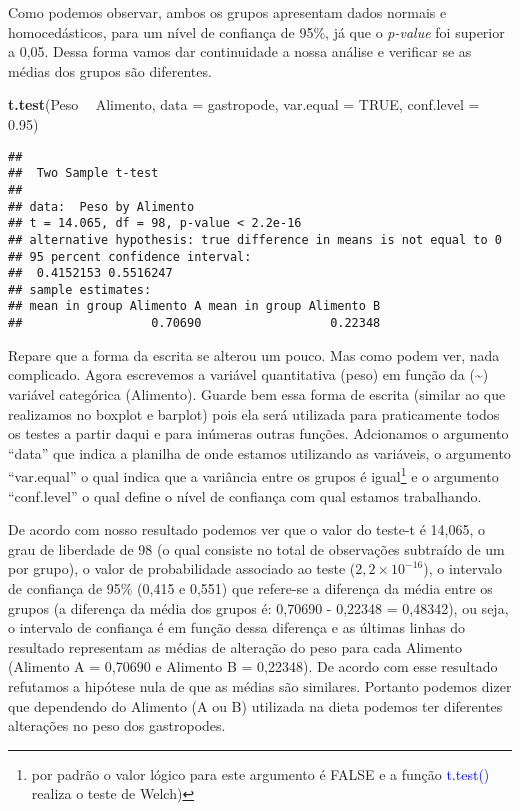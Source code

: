 \documentclass[14pt,titlepage, oneside, openany, a4paper]{book}
\newenvironment{Shaded}{\begin{snugshade}}{\end{snugshade}}
\newcommand{\DataTypeTok}[1]{\textcolor[rgb]{0.13,0.29,0.53}{#1}}
\newcommand{\FloatTok}[1]{\textcolor[rgb]{0.00,0.00,0.81}{#1}}
\newcommand{\KeywordTok}[1]{\textcolor[rgb]{0.13,0.29,0.53}{\textbf{#1}}}
\newcommand{\NormalTok}[1]{#1}
\newcommand{\OperatorTok}[1]{\textcolor[rgb]{0.81,0.36,0.00}{\textbf{#1}}}
\newcommand{\OtherTok}[1]{\textcolor[rgb]{0.56,0.35,0.01}{#1}}
\newcommand{\StringTok}[1]{\textcolor[rgb]{0.31,0.60,0.02}{#1}}
\begin{document}
Como podemos observar, ambos os grupos apresentam dados normais e homocedásticos, para um nível de confiança de 95\%, já que o \emph{p-value} foi superior a 0,05. Dessa forma vamos dar continuidade a nossa análise e verificar se as médias dos grupos são diferentes.

\begin{Shaded}
\begin{Highlighting}[]
\KeywordTok{t.test}\NormalTok{(Peso }\OperatorTok{~}\StringTok{ }\NormalTok{Alimento, }
       \DataTypeTok{data =}\NormalTok{ gastropode,}
       \DataTypeTok{var.equal =} \OtherTok{TRUE}\NormalTok{,}
       \DataTypeTok{conf.level =} \FloatTok{0.95}\NormalTok{)}
\end{Highlighting}
\end{Shaded}

\begin{verbatim}
## 
##  Two Sample t-test
## 
## data:  Peso by Alimento
## t = 14.065, df = 98, p-value < 2.2e-16
## alternative hypothesis: true difference in means is not equal to 0
## 95 percent confidence interval:
##  0.4152153 0.5516247
## sample estimates:
## mean in group Alimento A mean in group Alimento B 
##                  0.70690                  0.22348
\end{verbatim}

Repare que a forma da escrita se alterou um pouco. Mas como podem ver, nada complicado. Agora escrevemos a variável quantitativa (peso) em função da (\textasciitilde{}) variável categórica (Alimento). Guarde bem essa forma de escrita (similar ao que realizamos no boxplot e barplot) pois ela será utilizada para praticamente todos os testes a partir daqui e para inúmeras outras funções. Adcionamos o argumento ``data'' que indica a planilha de onde estamos utilizando as variáveis, o argumento ``var.equal'' o qual indica que a variância entre os grupos é igual\footnote{por padrão o valor lógico para este argumento é FALSE e a função \textcolor{blue}{t.test()} realiza o teste de Welch)} e o argumento ``conf.level'' o qual define o nível de confiança com qual estamos trabalhando.

De acordo com nosso resultado podemos ver que o valor do teste-t é 14,065, o grau de liberdade de 98 (o qual consiste no total de observações subtraído de um por grupo), o valor de probabilidade associado ao teste (\(2,2\times10^{-16}\)), o intervalo de confiança de 95\% (0,415 e 0,551) que refere-se a diferença da média entre os grupos (a diferença da média dos grupos é: 0,70690 - 0,22348 = 0,48342), ou seja, o intervalo de confiança é em função dessa diferença e as últimas linhas do resultado representam as médias de alteração do peso para cada Alimento (Alimento A = 0,70690 e Alimento B = 0,22348). De acordo com esse resultado refutamos a hipótese nula de que as médias são similares. Portanto podemos dizer que dependendo do Alimento (A ou B) utilizada na dieta podemos ter diferentes alterações no peso dos gastropodes.
\end{document}
